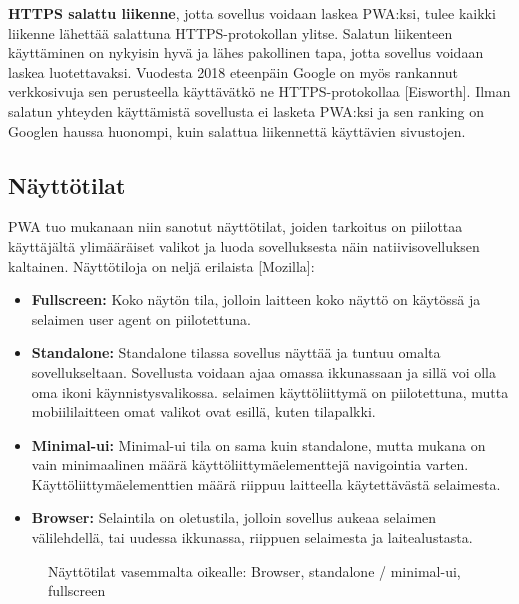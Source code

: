 \documentclass{tktltiki}
\begin{document}
\textbf{HTTPS salattu liikenne}, jotta sovellus voidaan laskea PWA:ksi, tulee kaikki liikenne lähettää salattuna HTTPS-protokollan ylitse. Salatun liikenteen käyttäminen on nykyisin hyvä ja lähes pakollinen tapa, jotta sovellus voidaan laskea luotettavaksi. Vuodesta 2018 eteenpäin Google on myös rankannut verkkosivuja sen perusteella käyttävätkö ne HTTPS-protokollaa [Eisworth]. Ilman salatun yhteyden käyttämistä sovellusta ei lasketa PWA:ksi ja sen ranking on Googlen haussa huonompi, kuin salattua liikennettä käyttävien sivustojen. 

\subsection{Näyttötilat}

PWA tuo mukanaan niin sanotut näyttötilat, joiden tarkoitus on piilottaa käyttäjältä ylimääräiset valikot ja luoda sovelluksesta näin natiivisovelluksen kaltainen. Näyttötiloja on neljä erilaista [Mozilla]:

\begin{itemize}
  \item \textbf{Fullscreen:} Koko näytön tila, jolloin laitteen koko näyttö on käytössä ja selaimen user agent on piilotettuna.
  \item \textbf{Standalone:} Standalone tilassa sovellus näyttää ja tuntuu omalta sovellukseltaan. Sovellusta voidaan ajaa omassa ikkunassaan ja sillä voi olla oma ikoni käynnistysvalikossa. selaimen käyttöliittymä on piilotettuna, mutta mobiililaitteen omat valikot ovat esillä, kuten tilapalkki. 
  \item \textbf{Minimal-ui:} Minimal-ui tila on sama kuin standalone, mutta mukana on vain minimaalinen määrä käyttöliittymäelementtejä navigointia varten. Käyttöliittymäelementtien määrä riippuu laitteella käytettävästä selaimesta. 
  \item \textbf{Browser:} Selaintila on oletustila, jolloin sovellus aukeaa selaimen välilehdellä, tai uudessa ikkunassa, riippuen selaimesta ja laitealustasta. 
\end{itemize}

\begin{figure}[h]
\begin{center}
\caption{Näyttötilat vasemmalta oikealle: Browser, standalone / minimal-ui, fullscreen}
\label{Näyttötilat}
\end{center}
\end{figure}
\clearpage
\end{document}
